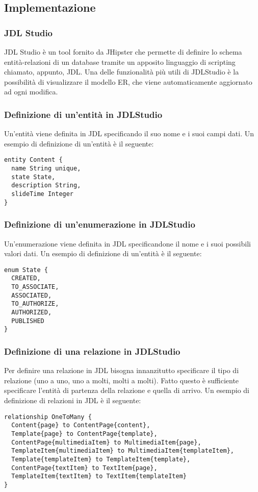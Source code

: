\subsection{Implementazione}
\subsubsection{JDL Studio}
JDL Studio è un tool fornito da JHipster che permette di definire lo schema entità-relazioni di un database tramite un apposito linguaggio di scripting chiamato, appunto, JDL. Una delle funzionalità più utili di JDLStudio è la possibilità di visualizzare il modello ER, che viene automaticamente aggiornato ad ogni modifica.
\newpage
\subsubsection{Definizione di un'entità in JDLStudio}
Un'entità viene definita in JDL specificando il suo nome e i suoi campi dati. Un esempio di definizione di un'entità è il seguente:
\begin{lstlisting}[caption={Definizione entità Content},label={lst:ent}]
entity Content {
  name String unique,
  state State,
  description String,
  slideTime Integer
}
\end{lstlisting}
\subsubsection{Definizione di un'enumerazione in JDLStudio}
Un'enumerazione viene definita in JDL specificandone il nome e i suoi possibili valori dati. Un esempio di definizione di un'entità è il seguente:
\begin{lstlisting}[caption={Definizione enumerazione State},label={lst:en}]
enum State {
  CREATED,
  TO_ASSOCIATE,
  ASSOCIATED,
  TO_AUTHORIZE,
  AUTHORIZED,
  PUBLISHED
}
\end{lstlisting}
\subsubsection{Definizione di una relazione in JDLStudio}
Per definire una relazione in JDL bisogna innanzitutto specificare il tipo di relazione (uno a uno, uno a molti, molti a molti). Fatto questo è sufficiente specificare l'entità di partenza della relazione e quella di arrivo. Un esempio di definizione di relazioni in JDL è il seguente:
\begin{lstlisting}[caption={Definizione relazioni uno a molti},label={lst:rel}]
relationship OneToMany {
  Content{page} to ContentPage{content},
  Template{page} to ContentPage{template},
  ContentPage{multimediaItem} to MultimediaItem{page},
  TemplateItem{multimediaItem} to MultimediaItem{templateItem},
  Template{templateItem} to TemplateItem{template},
  ContentPage{textItem} to TextItem{page},
  TemplateItem{textItem} to TextItem{templateItem}
}
\end{lstlisting}
\newpage
